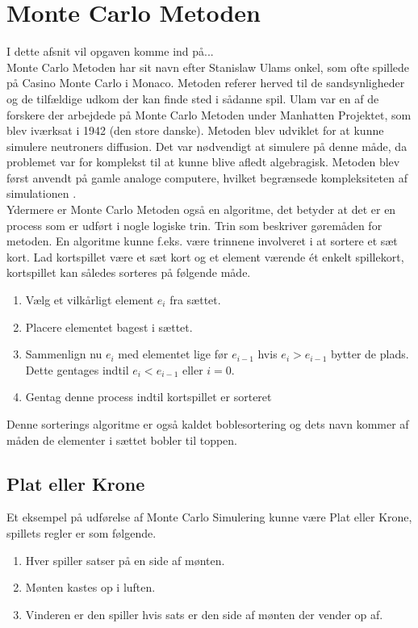 \documentclass[../../SRP.tex]{subfiles}
\begin{document}
\chapter{Monte Carlo Metoden}

I dette afsnit vil opgaven komme ind på... \\

Monte Carlo Metoden har sit navn efter Stanislaw Ulams onkel, som ofte spillede på Casino Monte Carlo i Monaco. Metoden referer herved til de sandsynligheder og de tilfældige udkom der kan finde sted i sådanne spil. Ulam var en af de forskere der arbejdede på Monte Carlo Metoden under Manhatten Projektet, som blev iværksat i 1942 (den store danske). Metoden blev udviklet for at kunne simulere neutroners diffusion. Det var nødvendigt at simulere på denne måde, da problemet var for komplekst til at kunne blive afledt algebragisk. Metoden blev først anvendt på gamle analoge computere, hvilket begrænsede kompleksiteten af simulationen \cite{AHF}. \\

Ydermere er Monte Carlo Metoden også en algoritme, det betyder at det er en process som er udført i nogle logiske trin. Trin som beskriver gøremåden for metoden. En algoritme kunne f.eks. være trinnene involveret i at sortere et sæt kort. Lad kortspillet være et sæt kort og et element værende ét enkelt spillekort, kortspillet kan således sorteres på følgende måde.
\begin{enumerate}
  \item Vælg et vilkårligt element $e_i$ fra sættet.
  
  \item Placere elementet bagest i sættet.

  \item Sammenlign nu $e_i$ med elementet lige før $e_{i-1}$ hvis $e_i > e_{i-1}$ bytter de plads. Dette gentages indtil $e_i < e_{i-1}$ eller $i = 0$.

  \item Gentag denne process indtil kortspillet er sorteret
\end{enumerate}
Denne sorterings algoritme er også kaldet boblesortering og dets navn kommer af måden de elementer i sættet bobler til toppen. \cite{BS} \\

\section{Plat eller Krone}
Et eksempel på udførelse af Monte Carlo Simulering kunne være Plat eller Krone, spillets regler er som følgende.
\begin{enumerate}
  \item Hver spiller satser på en side af mønten.

  \item Mønten kastes op i luften.

  \item Vinderen er den spiller hvis sats er den side af mønten der vender op af.
\end{enumerate}
\end{document}
